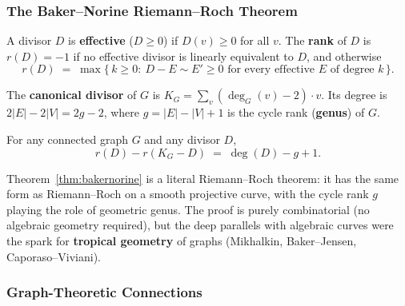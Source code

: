 \subsubsection{The Baker--Norine Riemann--Roch Theorem}

\begin{definition}
A divisor $D$ is \textbf{effective} ($D \ge 0$) if $D(v) \ge 0$ for
all $v$. The \textbf{rank} of $D$ is $r(D) = -1$ if no effective
divisor is linearly equivalent to $D$, and otherwise
\[
  r(D) \;=\; \max\{\, k \ge 0 :\ D - E \sim E' \ge 0 \text{ for every effective } E \text{ of degree } k\,\}.
\]
\end{definition}

\begin{definition}
The \textbf{canonical divisor} of $G$ is $K_G = \sum_v (\deg_G(v) - 2) \cdot v$.
Its degree is $2|E| - 2|V| = 2g - 2$, where $g = |E| - |V| + 1$ is the cycle rank
(\textbf{genus}) of $G$.
\end{definition}

\begin{theorem}\label{thm:bakernorine}
For any connected graph $G$ and any divisor $D$,
\[
  r(D) - r(K_G - D) \;=\; \deg(D) - g + 1.
\]
\end{theorem}

\begin{remark}
Theorem~\ref{thm:bakernorine} is a literal Riemann--Roch theorem:
it has the same form as Riemann--Roch on a smooth projective curve,
with the cycle rank $g$ playing the role of geometric genus. The
proof is purely combinatorial (no algebraic geometry required), but
the deep parallels with algebraic curves were the spark for
\textbf{tropical geometry} of graphs (Mikhalkin, Baker--Jensen,
Caporaso--Viviani).
\end{remark}

\subsubsection{Graph-Theoretic Connections}

